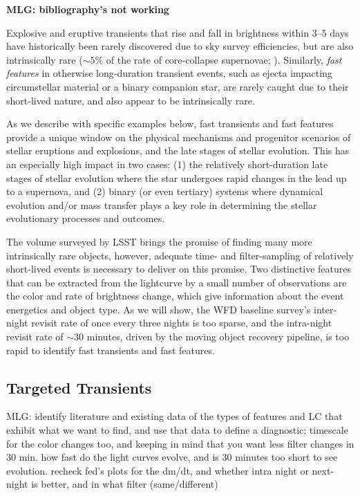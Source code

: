 \documentclass[11pt]{article}
\begin{document}
{\bf MLG: bibliography's not working}

Explosive and eruptive transients that rise and fall in brightness within $3$--$5$ days have historically been rarely discovered due to sky survey efficiencies, but are also intrinsically rare ($\sim 5\%$ of the rate of core-collapse supernovae; \cite{2014ApJ...794...23D}). Similarly, {\it fast features} in otherwise long-duration transient events, such as ejecta impacting circumstellar material or a binary companion star, are rarely caught due to their short-lived nature, and also appear to be intrinsically rare.

As we describe with specific examples below, fast transients and fast features provide a unique window on the physical mechanisms and progenitor scenarios of stellar eruptions and explosions, and the late stages of stellar evolution. This has an especially high impact in two cases: (1) the relatively short-duration late stages of stellar evolution where the star undergoes rapid changes in the lead up to a supernova, and (2) binary (or even tertiary) systems where dynamical evolution and/or mass transfer plays a key role in determining the stellar evolutionary processes and outcomes. 

The volume surveyed by LSST brings the promise of finding many more intrinsically rare objects, however, adequate time- and filter-sampling of relatively short-lived events is necessary to deliver on this promise. Two distinctive features that can be extracted from the lightcurve by a small number of observations are the color and rate of brightness change, which give information about the event energetics and object type. As we will show, the WFD baseline survey's inter-night revisit rate of once every three nights is too sparse, and the intra-night revisit rate of $\sim30$ minutes, driven by the moving object recovery pipeline, is too rapid to identify fast transients and fast features. 




\subsection{Targeted Transients}

MLG: identify literature and existing data of the types of features and LC that exhibit what we want to find, and use that data to define a diagnostic; timescale for the color changes too, and keeping in mind that you want less filter changes in 30 min. how fast do the light curves evolve, and is 30 minutes too short to see evolution. recheck fed's plots for the dm/dt, and whether intra night or next-night is better, and in what filter (same/different)
\end{document}
